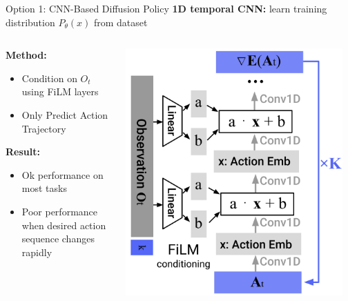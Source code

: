\documentclass{beamer}
\begin{document}
\begin{frame}[t]{Option 1: CNN-Based Diffusion Policy}
    \textbf{1D temporal CNN:} learn training distribution $P_{\theta}(x)$ from dataset
	\begin{columns}
		\begin{column}{.5\textwidth}
            \textbf{Method:}
            \begin{itemize}[label=-]
                \item Condition on $O_t$ using FiLM layers
                \item Only Predict Action Trajectory 
            \end{itemize}
            \textbf{Result:}
            \begin{itemize}[label=-]
                \item Ok performance on most tasks 
                \item Poor performance when desired action sequence changes rapidly
            \end{itemize}
		\end{column}
		\begin{column}{.5\textwidth}
			\begin{center}
                \includegraphics[width=0.95\textwidth]{./img/cnn_diffusion.png}
			\end{center}
		\end{column}
	\end{columns}
\end{frame}
\end{document}
